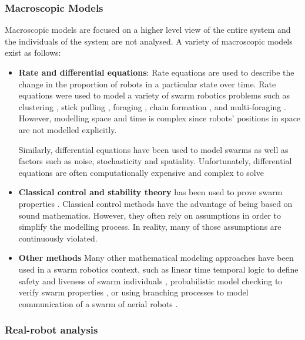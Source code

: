 \subsubsection{Macroscopic Models}
\label{macroscopicmodels}

Macroscopic models are focused on a higher level view of the entire system and the individuals of the system are not analysed. A variety of macroscopic models exist as follows: 
\begin{itemize}
	\item \textbf{Rate and differential equations}: Rate equations are used to describe the change in the proportion of robots in a particular state over time. Rate equations were used to model a variety of swarm robotics problems such as  clustering \cite{martinoli1999understanding}, stick pulling \cite{lerman2001macroscopic}, foraging \cite{lerman2002mathematical}, chain formation \cite{trianni2002modeling}, and multi-foraging \cite{campo2007efficient}. However, modelling space and time is complex since robots' positions in space are not modelled explicitly.

Similarly, differential equations have been used to model swarms as well as factors such as noise, stochasticity and spatiality. Unfortunately, differential equations are often computationally expensive and complex to solve \cite{hamann2008framework, prorok2011multi}

	\item \textbf{Classical control and stability theory} has been used to prove swarm properties \cite{gazi2005stability,liu2004stable, schwager2011time}.  Classical control methods have the advantage of being based on sound mathematics. However, they often rely on assumptions in order to simplify the modelling process. In reality, many of those assumptions are continuously violated.
	
	\item \textbf{Other methods}
	Many other mathematical modeling approaches have been used in a swarm robotics context, such as linear time temporal logic to define safety and liveness of swarm individuals \cite{winfield2005formal}, probabilistic model checking to verify swarm properties \cite{konur2012analysing}, or using branching processes to model communication of a swarm of aerial robots \cite{mathews2010establishing}. 
\end{itemize}

\subsubsection{Real-robot analysis}

